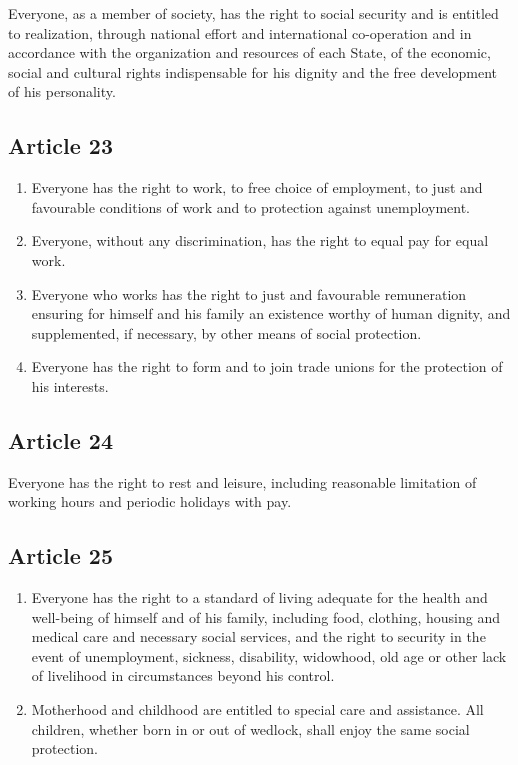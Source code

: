 \documentclass[
  titlepage,
  openright,
  DIV=calc,
  toc=listof,
  listof=nochaptergap]{scrbook}
\begin{document}
Everyone, as a member of society, has the right to social security and
is entitled to realization, through national effort and international
co-operation and in accordance with the organization and resources of
each State, of the economic, social and cultural rights indispensable
for his dignity and the free development of his personality.

\subsection{Article 23}\label{article-23}

\begin{enumerate}
\def\labelenumi{\arabic{enumi}.}
\item
  Everyone has the right to work, to free choice of employment, to just
  and favourable conditions of work and to protection against
  unemployment.
\item
  Everyone, without any discrimination, has the right to equal pay for
  equal work.
\item
  Everyone who works has the right to just and favourable remuneration
  ensuring for himself and his family an existence worthy of human
  dignity, and supplemented, if necessary, by other means of social
  protection.
\item
  Everyone has the right to form and to join trade unions for the
  protection of his interests.
\end{enumerate}

\subsection{Article 24}\label{article-24}

Everyone has the right to rest and leisure, including reasonable
limitation of working hours and periodic holidays with pay.

\subsection{Article 25}\label{article-25}

\begin{enumerate}
\def\labelenumi{\arabic{enumi}.}
\item
  Everyone has the right to a standard of living adequate for the health
  and well-being of himself and of his family, including food, clothing,
  housing and medical care and necessary social services, and the right
  to security in the event of unemployment, sickness, disability,
  widowhood, old age or other lack of livelihood in circumstances beyond
  his control.
\item
  Motherhood and childhood are entitled to special care and assistance.
  All children, whether born in or out of wedlock, shall enjoy the same
  social protection.
\end{enumerate}
\end{document}
